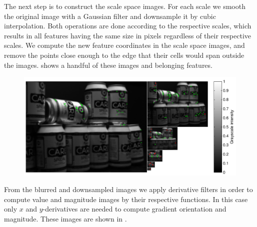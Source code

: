 \documentclass[thesis.tex]{subfiles}
\begin{document}
The next step is to construct the scale space images. For each scale we smooth the original image with a Gaussian filter and downsample it by cubic interpolation. Both operations are done according to the respective scales, which results in all features having the same size in pixels regardless of their respective scales. We compute the new feature coordinates in the scale space images, and remove the points close enough to the edge that their cells would span outside the images.  shows a handful of these images and belonging features.

\begin{figure}[tb]
    \centering
    \includegraphics[width=\textwidth]{img/cellHistScaleSpacesP.pdf}
    \caption{}
    \label{fig:cellHistScaleSpacesP}
\end{figure}

From the blurred and downsampled images we apply derivative filters in order to compute value and magnitude images by their respective functions. In this case only $x$ and $y$-derivatives are needed to compute gradient orientation and magnitude. These images are shown in .
\end{document}
